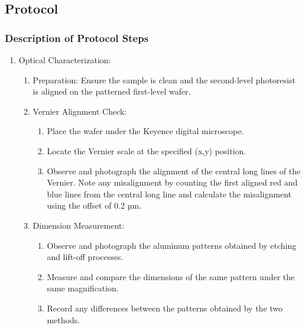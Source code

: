\documentclass[a4paper, table]{article}
\begin{document}
\pagebreak
\subsection{Protocol}
\subsubsection{Description of Protocol Steps}
\begin{enumerate}
    \item Optical Characterization:
    \begin{enumerate}
        \item Preparation: Ensure the sample is clean and the second-level photoresist is aligned on the patterned first-level wafer.
        \item Vernier Alignment Check:
        \begin{enumerate}
            \item Place the wafer under the Keyence digital microscope.
            \item Locate the Vernier scale at the specified (x,y) position.
            \item Observe and photograph the alignment of the central long lines of the Vernier. Note any misalignment by counting the first aligned red and blue lines from the central long line and calculate the misalignment using the offset of 0.2 µm.
        \end{enumerate}
        \item Dimension Measurement:
        \begin{enumerate}
            \item Observe and photograph the aluminum patterns obtained by etching and lift-off processes.
            \item Measure and compare the dimensions of the same pattern under the same magnification.
            \item Record any differences between the patterns obtained by the two methods.
        \end{enumerate}
    \end{enumerate}
    

\end{enumerate}
\end{document}
